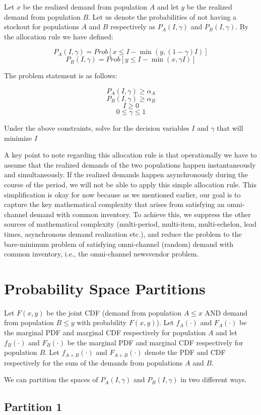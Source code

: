 \documentclass[11pt]{article}   	%
\begin{document}
Let $x$ be the realized demand from population $A$ and let $y$ be the realized demand from population $B$. Let us denote the probabilities of not having a stockout for populations $A$ and $B$ respectively as $P_A(I, \gamma)$ and $P_B(I, \gamma)$. By the allocation rule we have defined:

$$P_A(I, \gamma) = Prob[x \leq I - \min{(y, (1 - \gamma) I)}]$$
$$P_B(I, \gamma) = Prob[y \leq I - \min{(x, \gamma I)}]$$

The problem statement is as follows:

$$P_A(I, \gamma) \geq \alpha_A$$
$$P_B(I, \gamma) \geq \alpha_B$$
$$I \geq 0$$
$$0 \leq \gamma \leq 1$$

Under the above constraints, solve for the decision variables $I$ and $\gamma$ that will minimize $I$

A key point to note regarding this allocation rule is that operationally we have to assume that the realized demands of the two populations happen instantaneously and simultaneously. If the realized demands happen asynchronously during the course of the period, we will not be able to apply this simple allocation rule. This simplification is okay for now because as we mentioned earlier, our goal is to capture the key mathematical complexity that arises from satisfying an omni-channel demand with common inventory. To achieve this, we suppress the other sources of mathematical complexity (multi-period, multi-item, multi-echelon, lead times, asynchronous demand realization etc.), and reduce the problem to the bare-minimum problem of satisfying omni-channel (random) demand with common inventory, i.e., the omni-channel newsvendor problem.

\section{Probability Space Partitions}

Let $F(x,y)$ be the joint CDF (demand from population $A \leq x$ AND demand from population $B \leq y$ with probability $F(x,y)$). Let $f_A(\cdot)$ and $F_A(\cdot)$ be the marginal PDF and marginal CDF respectively for population $A$ and let $f_B(\cdot)$ and $F_B(\cdot)$ be the marginal PDF and marginal CDF respectively for population $B$.  Let $f_{A+B}(\cdot)$ and $F_{A+B}(\cdot)$ denote the PDF and CDF respectively for the sum of the demands from populations $A$ and $B$.

 We can partition the spaces of $P_A(I, \gamma)$ and $P_B(I, \gamma)$ in two different ways.
\subsection{Partition 1}
\end{document}
